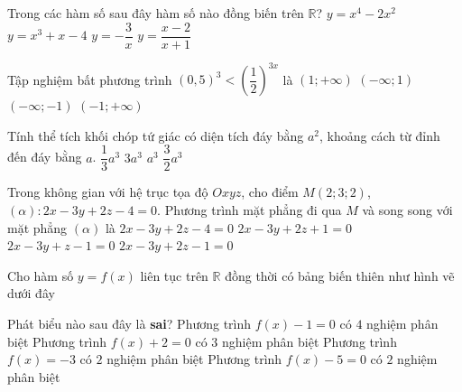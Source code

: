 \begin{ex}%
	Trong các hàm số sau đây hàm số nào đồng biến trên $\mathbb{R}$?
	\choice
	{$y=x^4-2x^2$}
	{\True $y=x^3+x-4$}
	{$y=-\dfrac{3}{x}$}
	{$y=\dfrac{x-2}{x+1}$}
\end{ex}
\begin{ex}%
	Tập nghiệm bất phương trình $\left(0,5\right)^3<\left(\dfrac{1}{2}\right)^{3x}$ là
	\choice
	{$(1;+\infty)$}
	{\True $(-\infty;1)$}
	{$(-\infty;-1)$}
	{$(-1;+\infty)$}
\end{ex}
\begin{ex}%
	Tính thể tích khối chóp tứ giác có diện tích đáy bằng $a^2$, khoảng cách từ đỉnh đến đáy bằng $a$.
	\choice
	{\True $\dfrac{1}{3}a^3$}
	{$3a^3$}
	{$a^3$}
	{$\dfrac{3}{2}a^3$}
\end{ex}
\begin{ex}%
	Trong không gian với hệ trục tọa độ $Oxyz$, cho điểm $M(2;3;2)$, $(\alpha) \colon 2x-3y+2z-4=0$. Phương trình mặt phẳng đi qua $M$ và song song với mặt phẳng $(\alpha)$ là
	\choice
	{$2x-3y+2z-4=0$}
	{\True $2x-3y+2z+1=0$}
	{$2x-3y+z-1=0$}
	{$2x-3y+2z-1=0$}
\end{ex}
\begin{ex}%
	Cho hàm số $y=f(x)$ liên tục trên $\mathbb{R}$ đồng thời có bảng biến thiên như hình vẽ dưới đây
	\begin{center}
	\end{center}
	Phát biểu nào sau đây là \textbf{sai}?
	\choice
	{Phương trình $f(x)-1=0$ có $4$ nghiệm phân biệt}
	{Phương trình $f(x)+2=0$ có $3$ nghiệm phân biệt}
	{Phương trình $f(x)=-3$ có $2$ nghiệm phân biệt}
	{\True Phương trình $f(x)-5=0$ có $2$ nghiệm phân biệt}
\end{ex}
